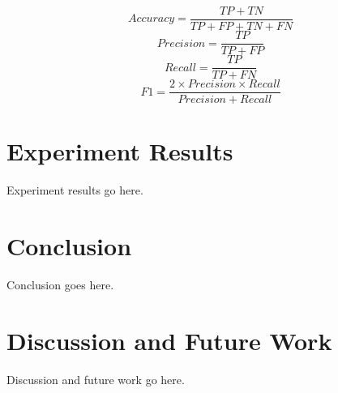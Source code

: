 \documentclass[11pt]{article}
\begin{document}
\[
Accuracy = \frac{TP+TN}{TP+FP+TN+FN}
\]
\[
Precision = \frac{TP}{TP+FP}
\]
\[
Recall = \frac{TP}{TP+FN}
\]
\[
F1 = \frac{2 \times Precision \times Recall}{Precision + Recall}
\]


\section{Experiment Results}

Experiment results go here.

\begin{figure}[htbp]
\centering
{}%
\end{figure}

\section{Conclusion}

Conclusion goes here.

\section{Discussion and Future Work}

Discussion and future work go here.



\end{document}
